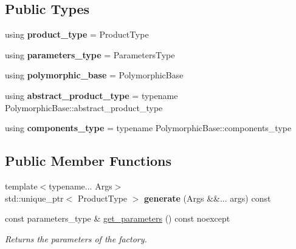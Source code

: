 \subsection*{Public Types}
\begin{DoxyCompactItemize}
\item 
\mbox{\label{classgko_1_1EnableDefaultFactory_ac762510ed96961493c273338ca358ecf}} 
using {\bfseries product\+\_\+type} = Product\+Type
\item 
\mbox{\label{classgko_1_1EnableDefaultFactory_a911e420cd7f7c7f5550abbf0e788b59a}} 
using {\bfseries parameters\+\_\+type} = Parameters\+Type
\item 
\mbox{\label{classgko_1_1EnableDefaultFactory_a76344d95116ad7c95190152ecd64c2fb}} 
using {\bfseries polymorphic\+\_\+base} = Polymorphic\+Base
\item 
\mbox{\label{classgko_1_1EnableDefaultFactory_ae1741e6f98c9a038a0bae24804a20f34}} 
using {\bfseries abstract\+\_\+product\+\_\+type} = typename Polymorphic\+Base\+::abstract\+\_\+product\+\_\+type
\item 
\mbox{\label{classgko_1_1EnableDefaultFactory_a5006a049ebb2f4d5c0f274f9d82ce870}} 
using {\bfseries components\+\_\+type} = typename Polymorphic\+Base\+::components\+\_\+type
\end{DoxyCompactItemize}
\subsection*{Public Member Functions}
\begin{DoxyCompactItemize}
\item 
\mbox{\label{classgko_1_1EnableDefaultFactory_adc2fe350c1549e20ff5fec67c315d8f4}} 
{\footnotesize template$<$typename... Args$>$ }\\std\+::unique\+\_\+ptr$<$ Product\+Type $>$ {\bfseries generate} (Args \&\&... args) const
\item 
const parameters\+\_\+type \& \hyperlink{classgko_1_1EnableDefaultFactory_ae32f2b3100640293f3a46e1280965162}{get\+\_\+parameters} () const noexcept
\begin{DoxyCompactList}\small\item\em Returns the parameters of the factory. \end{DoxyCompactList}\end{DoxyCompactItemize}

